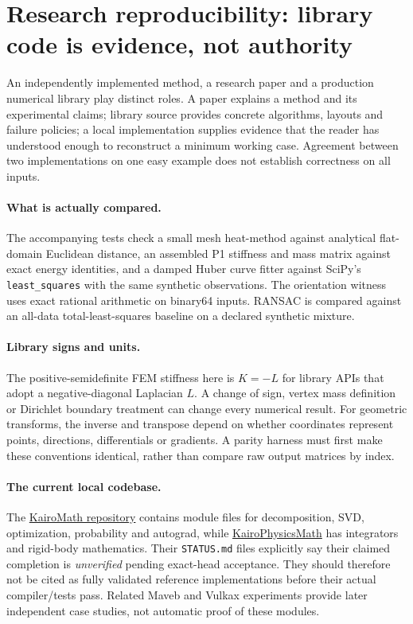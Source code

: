 \clearpage
\section*{Research reproducibility: library code is evidence, not authority}
\noindent An independently implemented method, a research paper
and a production numerical library play distinct roles.
A paper explains a method and its experimental claims; library
source provides concrete algorithms, layouts and failure policies;
a local implementation supplies evidence that the reader has
understood enough to reconstruct a minimum working case.
Agreement between two implementations on one easy example
does not establish correctness on all inputs.

\paragraph{What is actually compared.}
The accompanying tests check a small mesh heat-method against
analytical flat-domain Euclidean distance, an assembled
P1 stiffness and mass matrix against exact energy identities,
and a damped Huber curve fitter against SciPy's
\texttt{least\_squares} with the same synthetic observations.
The orientation witness uses exact rational arithmetic on
binary64 inputs. RANSAC is compared against an all-data
total-least-squares baseline on a declared synthetic mixture.

\paragraph{Library signs and units.}
The positive-semidefinite FEM stiffness here is \(K=-L\)
for library APIs that adopt a negative-diagonal Laplacian
\(L\). A change of sign, vertex mass definition or
Dirichlet boundary treatment can change every numerical result.
For geometric transforms, the inverse and transpose depend on
whether coordinates represent points, directions, differentials
or gradients. A parity harness must first make these conventions
identical, rather than compare raw output matrices by index.

\paragraph{The current local codebase.}
The \href{https://github.com/swayam8624/KairoMath}
{KairoMath repository} contains module files for decomposition,
SVD, optimization, probability and autograd, while
\href{https://github.com/swayam8624/KairoPhysicsMath}
{KairoPhysicsMath} has integrators and rigid-body mathematics.
Their \texttt{STATUS.md} files explicitly say their claimed
completion is \emph{unverified} pending exact-head acceptance.
They should therefore not be cited as fully validated reference
implementations before their actual compiler/tests pass.
Related Maveb and Vulkax experiments provide later independent
case studies, not automatic proof of these modules.

